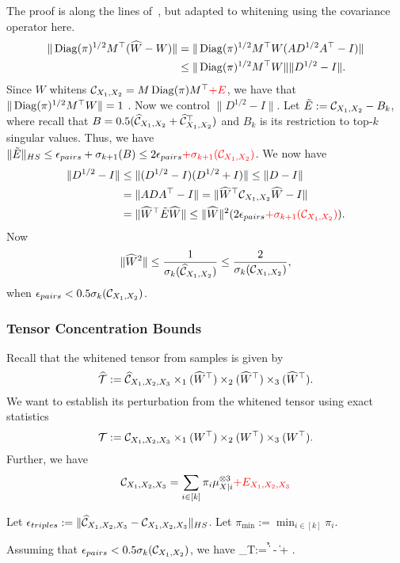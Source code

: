 \bprf The proof is along the lines of~\cite[Lemma 16]{AnandkumarEtal:community12}, but adapted to whitening using the covariance operator here.
 \begin{align*}\|\operatorname{Diag}(\pi)^{1/2} M^\top(\widehat{W}-W)\|&= 
\|\operatorname{Diag}(\pi)^{1/2} M^\top W(A D^{1/2} A^\top -I)\|\\ &\leq\|\operatorname{Diag}(\pi)^{1/2} M^\top W\| \|D^{1/2}-I\|. \end{align*} Since $W$ whitens $\mathcal{C}_{X_1, X_2}=M \operatorname{Diag}(\pi) M^\top\textcolor{red}{+E}$, we have that $\|\operatorname{Diag}(\pi)^{1/2} M^\top W\|=1$ . Now we control $\|D^{1/2}-I\|$.  Let $\tilde{E}:= \mathcal{C}_{X_1,X_{2}} -B_k$, where recall that $B=0.5( \widehat {\mathcal{C}}_{X_1,X_{2}}+ \widehat{\mathcal{C}}_{X_1, X_2}^\top)$ and $B_k$ is its restriction to top-$k$ singular values. Thus, we have $\|\tilde{E}\|_{HS} \leq \epsilon_{pairs} + \sigma_{k+1}(B)\leq 2\epsilon_{pairs}\textcolor{red}{+\sigma_{k+1}(\mathcal{C}_{X_1,X_2})} $.
 We now have
\begin{align*}
\|D^{1/2}-I\|&\leq \|(D^{1/2}-I)(D^{1/2}+I)\|\leq \|D-I\|
\\ &=\|AD A^\top - I\| = \|\widehat{W}^\top \mathcal{C}_{X_1, X_2}  \widehat{W} -I\|\\ &=\| \widehat{W}^\top  \tilde{E} \widehat{W}\| \leq \|\widehat{W}\|^2 ( 2 \epsilon_{pairs}\textcolor{red}{+\sigma_{k+1}(\mathcal{C}_{X_1,X_2})}).
\end{align*}Now
\[ \|\widehat{W}^2\| \leq\frac{1}{ \sigma_k(\widehat{\mathcal{C}}_{X_1, X_2})}\leq \frac{2}{\sigma_k(\mathcal{C}_{X_1, X_2})},\] when  $\epsilon_{pairs}<0.5 \sigma_k(\mathcal{C}_{X_1, X_2})$.
\eprf

\subsubsection{Tensor Concentration Bounds}

Recall that the whitened tensor from samples is given by
$$\widehat{{\mathcal{T}}} := \widehat{\mathcal{C}}_{X_1,X_2,X_3} \times_1 (\widehat{W}^\top) \times_2 (\widehat{W}^\top) \times_3 (\widehat{W}^\top).$$ We want to establish its perturbation from the whitened tensor using exact statistics
$${\mathcal{T}} := \mathcal{C}_{X_1,X_2,X_3} \times_1 (W^\top) \times_2 (W^\top) \times_3 (W^\top).$$ Further, we have 
$$\mathcal{C}_{X_1,X_2,X_3}= \sum_{i\in [k]} \pi_i \mu_{X|i}^{\otimes 3}\textcolor{red}{+ E_{X_1, X_2, X_3}}$$

Let $\epsilon_{triples}:= \|\widehat{\mathcal{C}}_{X_1,X_2,X_3}-\mathcal{C}_{X_1,X_2,X_3}\|_{HS}$. Let $\pi_{\min}:=\min_{i\in [k]}\pi_i$.

\begin{lemma}
Assuming that $\epsilon_{pairs} < 0.5 \sigma_k(\mathcal{C}_{X_1, X_2})$, we have
\beq\label{eqn:epsilonT} \epsilon_T:= \|\h{\Tcal} - \Tcal\|
\leq {}+
.\eeq
\end{lemma} 


